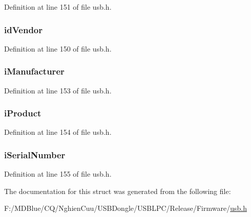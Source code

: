 Definition at line 151 of file usb.h.

\hypertarget{struct___u_s_b___d_e_v_i_c_e___d_e_s_c_r_i_p_t_o_r_aa6705f738420468e35fa0bcc980ef1d8}{
\subsubsection[{idVendor}]{ {\bf idVendor}}}
\label{struct___u_s_b___d_e_v_i_c_e___d_e_s_c_r_i_p_t_o_r_aa6705f738420468e35fa0bcc980ef1d8}


Definition at line 150 of file usb.h.

\hypertarget{struct___u_s_b___d_e_v_i_c_e___d_e_s_c_r_i_p_t_o_r_a7ba414cda1ee046efab1b799bddc1547}{
\subsubsection[{iManufacturer}]{ {\bf iManufacturer}}}
\label{struct___u_s_b___d_e_v_i_c_e___d_e_s_c_r_i_p_t_o_r_a7ba414cda1ee046efab1b799bddc1547}


Definition at line 153 of file usb.h.

\hypertarget{struct___u_s_b___d_e_v_i_c_e___d_e_s_c_r_i_p_t_o_r_a48e208396415b774014fca5687260a85}{
\subsubsection[{iProduct}]{ {\bf iProduct}}}
\label{struct___u_s_b___d_e_v_i_c_e___d_e_s_c_r_i_p_t_o_r_a48e208396415b774014fca5687260a85}


Definition at line 154 of file usb.h.

\hypertarget{struct___u_s_b___d_e_v_i_c_e___d_e_s_c_r_i_p_t_o_r_a5b35b5444cd62332c2c66a08658c7b19}{
\subsubsection[{iSerialNumber}]{ {\bf iSerialNumber}}}
\label{struct___u_s_b___d_e_v_i_c_e___d_e_s_c_r_i_p_t_o_r_a5b35b5444cd62332c2c66a08658c7b19}


Definition at line 155 of file usb.h.



The documentation for this struct was generated from the following file:\begin{DoxyCompactItemize}
\item 
F:/MDBlue/CQ/NghienCuu/USBDongle/USBLPC/Release/Firmware/\hyperlink{usb_8h}{usb.h}\end{DoxyCompactItemize}
